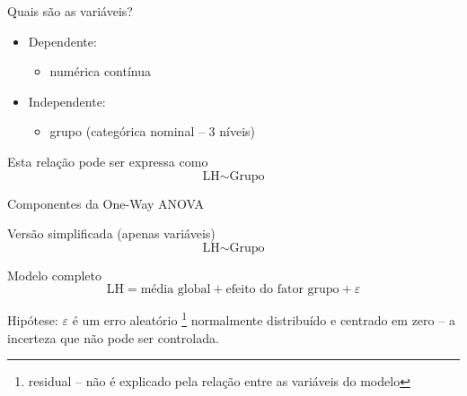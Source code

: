 \documentclass{beamer}
\begin{document}
\begin{frame}{Quais são as variáveis?}
  \begin{itemize}
    \small
  \item Dependente:
    \begin{itemize}
      \footnotesize
    \item numérica contínua
    \end{itemize}
  \item Independente:
    \begin{itemize}
      \footnotesize
    \item grupo (categórica nominal -- 3 níveis)
    \end{itemize}
  \end{itemize}
  \vfill
  \begin{block}{Esta relação pode ser expressa como}
    \begin{displaymath}
      \text{LH} \sim \text{Grupo}
    \end{displaymath}
  \end{block}
\end{frame}

\begin{frame}{\small Componentes da One-Way ANOVA}
  \begin{block}{\footnotesize Versão simplificada (apenas variáveis)}
    \footnotesize
    \begin{displaymath}
      \text{LH} \sim \text{Grupo}
    \end{displaymath}
  \end{block}
  \bigskip
  \bigskip
  \begin{block}{Modelo completo}
    \begin{displaymath}
      \text{LH} = \text{média global} + \text{efeito do fator grupo} + \varepsilon
    \end{displaymath}
  \end{block}
  \vfill
  \footnotesize
  Hipótese: $\varepsilon$ é um erro aleatório \footnote{\scriptsize residual -- não é explicado pela relação entre as variáveis do modelo} normalmente distribuído e centrado em zero -- a incerteza que não pode ser controlada.
\end{frame}
\end{document}
